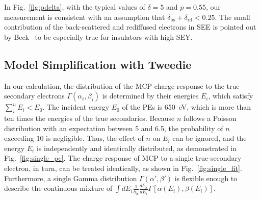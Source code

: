 In Fig.~\ref{fig:pdelta}, with the typical values of \(\delta=5\) and \(p=0.55\),
our measurement is consistent with an assumption that \(\delta_\text{bs} + \delta_\text{rd} < 0.25\).
The small contribution of the back-scattered and rediffused electrons in SEE is pointed out by Beck~\cite{beck_physical_1966} to be especially true for insulators with high SEY.




\subsection{Model Simplification with Tweedie}\label{sec:model}
In our calculation, the distribution of the MCP charge response to the true-secondary electrons $\varGamma(\alpha_{i},\beta_{i})$ is determined by their energies $E_{i}$,
which satisfy $\sum_{i}^{n}E_{i}<E_0$.
The incident energy \(E_0\) of the PEs is \SI{650}{eV},
which is more than ten times the energies of the true secondaries.
Because $n$ follows a Poisson distribution with an expectation between 5 and 6.5,
the probability of $n$ exceeding 10 is negligible.
Thus, the effect of $n$ on $E_{i}$ can be ignored,
and the energy \(E_{i}\) is independently and identically distributed, as demonstrated in Fig.~\ref{fig:single_pe}.
The charge response of MCP to a single true-secondary electron, in turn, can be treated identically, as shown in Fig.~\ref{fig:single_fit}.
Furthermore, a single Gamma distribution \(\varGamma(\alpha',\beta')\)
is flexible enough to describe the continuous mixture of
\(\int dE_{i}\frac{1}{\delta_{\mathrm{ts}}}\frac{d\delta_{\mathrm{ts}}}{dE_{i}}\varGamma[\alpha(E_{i}),\beta(E_{i})]\).

